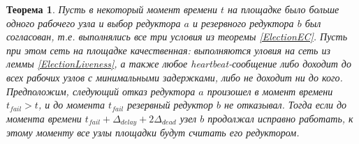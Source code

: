\documentclass{article}
\theoremstyle{plain}
\newtheorem{theorem}{Теорема}[section]
\theoremstyle{plain}
\theoremstyle{plain}
\theoremstyle{plain}
\theoremstyle{definition}
\theoremstyle{remark}
\theoremstyle{plain}
\begin{document}
\begin{theorem}
\label{ReelectionTheorem}
    Пусть в некоторый момент времени $t$ на площадке было больше одного рабочего узла и выбор редуктора $a$ и резервного редуктора $b$ был согласован, т.е. выполнялись все три условия из теоремы \ref{ElectionEC}. Пусть при этом сеть на площадке качественная: выполняются уловия на сеть из леммы \ref{ElectionLiveness}, а также любое heartbeat-сообщение либо доходит до всех рабочих узлов с минимальными задержками, либо не доходит ни до кого. Предположим, следующий отказ редуктора $a$ произошел в момент времени $t_{fail} > t$, и до момента $t_{fail}$ резервный редуктор $b$ не отказывал. Тогда если до момента времени $t_{fail} + \Delta_{delay} + 2\Delta_{dead}$ узел $b$ продолжал исправно работать, к этому моменту все узлы площадки будут считать его редуктором.
\end{theorem}
\end{document}
